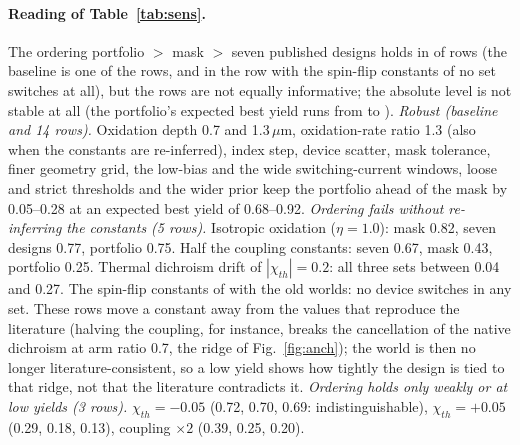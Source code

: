 \paragraph{Reading of Table~\ref{tab:sens}.} The ordering portfolio $>$ mask $>$ seven published designs holds in \sensOk{} of \sensN{} rows (the baseline is one of the rows, and in the row with the spin-flip constants of \cite{chen2026meta} no set switches at all), but the rows are not equally informative; the absolute level is not stable at all (the portfolio's expected best yield runs from \sensPortMin{} to \sensPortMax{}).
\emph{Robust (baseline and 14 rows).} Oxidation depth 0.7 and 1.3\,$\mu$m, oxidation-rate ratio 1.3 (also when the constants are re-inferred), index step, device scatter, mask tolerance, finer geometry grid, the low-bias and the wide switching-current windows, loose and strict thresholds and the wider prior keep the portfolio ahead of the mask by 0.05--0.28 at an expected best yield of 0.68--0.92.
\emph{Ordering fails without re-inferring the constants (5 rows).} Isotropic oxidation ($\eta=1.0$): mask 0.82, seven designs 0.77, portfolio 0.75. Half the coupling constants: seven 0.67, mask 0.43, portfolio 0.25. Thermal dichroism drift of $|\chi_{th}|=0.2$: all three sets between 0.04 and 0.27. The spin-flip constants of \cite{chen2026meta} with the old worlds: no device switches in any set.
These rows move a constant away from the values that reproduce the literature (halving the coupling, for instance, breaks the cancellation of the native dichroism at arm ratio 0.7, the ridge of Fig.~\ref{fig:anch}); the world is then no longer literature-consistent, so a low yield shows how tightly the design is tied to that ridge, not that the literature contradicts it.
\emph{Ordering holds only weakly or at low yields (3 rows).} $\chi_{th}=-0.05$ (0.72, 0.70, 0.69: indistinguishable), $\chi_{th}=+0.05$ (0.29, 0.18, 0.13), coupling $\times2$ (0.39, 0.25, 0.20).
